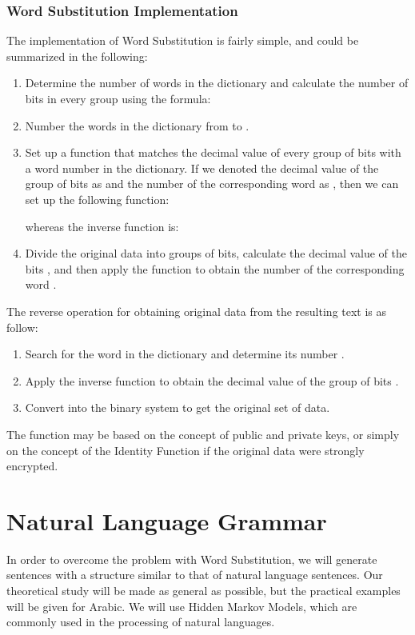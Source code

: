 \documentclass{acm_proc_article-sp}
\begin{document}
\subsubsection{Word Substitution Implementation}\label{Word-Substitution-Implementation}
The implementation of Word Substitution is fairly simple, and could be summarized in the following:
\begin{enumerate}
    \item Determine the number of words  in the dictionary and calculate the number of bits  in every group using the formula:
    
    \item Number the words in the dictionary from  to .
    \item Set up a function that matches the decimal value of every group of bits with a word number in the dictionary. If we denoted the decimal value of the group of bits as  and the number of the corresponding word as , then we can set up the following function:
    
    whereas the inverse function is:
    
    \item Divide the original data into groups of  bits, calculate the decimal value of the bits , and then apply the function  to obtain the number of the corresponding word .
\end{enumerate}
The reverse operation for obtaining original data from the resulting text is as follow:
\begin{enumerate}
    \item Search for the word in the dictionary and determine its number .
    \item Apply the inverse function  to obtain the decimal value of the group of bits .
    \item Convert  into the binary system to get the original set of data.
\end{enumerate}
The function  may be based on the concept of public and private keys, or simply on the concept of the Identity Function  if the original data were strongly encrypted.

\section{Natural Language Grammar}\label{Natural-Language-Grammar}
In order to overcome the problem with Word Substitution, we will generate sentences with a structure similar to that of natural language sentences. Our theoretical study will be made as general as possible, but the practical examples will be given for Arabic. We will use Hidden Markov Models, which are commonly used in the processing of natural languages.
\end{document}

